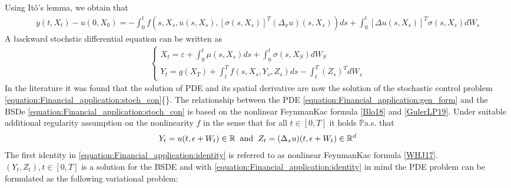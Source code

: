 \documentclass[letterpaper,10pt,english]{jupyterBook}
\begin{document}
\sphinxAtStartPar
Using Itô’s lemma, we obtain that
\begin{equation*}
\begin{split} y(t, X_t) - u(0,X_0) = - \int_0^t f(s,X_s,u(s,X_s), [\sigma(s,X_s)]^T(\Delta_x u)(s,X_s)) ds + \int_0^t[\Delta u(s,X_s)]^T\sigma(s,X_s)dW_s\end{split}
\end{equation*}
\sphinxAtStartPar
A backward stochstic differential equation can be written as
\begin{equation}\label{equation:Financial_application:stoch_con}
\begin{split}\begin{cases} X_t = \varepsilon + \int_0^t \mu(s,X_s) ds + \int_0^t\sigma(s,X_S)dW_S \\ 
Y_t = g(X_T) + \int_t^T f(s, X_s, Y_s, Z_s)ds - \int_t^T(Z_s)^T dW_s
\end{cases} \end{split}
\end{equation}
\sphinxAtStartPar
In the literature it was found that the solution of PDE and its spatial derivative are now the solution of the stochastic control problem \eqref{equation:Financial_application:stoch_con}\{\}. The relationship between the PDE \eqref{equation:Financial_application:gen_form} and the BSDe \eqref{equation:Financial_application:stoch_con} is based on the nonlinear Feynman\sphinxhyphen{}Kac formula {[}\hyperlink{cite.Discussion:id25}{Blo18}{]} and {[}\hyperlink{cite.Discussion:id40}{GulerLP19}{]}. Under suitable additional regularity assumption on the nonlinearity \(f\) in the sense that for all \(t \in[0,T]\) it holds \(\mathbb{P}\)\sphinxhyphen{}a.s. that
\begin{equation}\label{equation:Financial_application:identity}
\begin{split}Y_t = u(t, \epsilon + W_t) \in \mathbb{R}  \hspace{0.2cm}\text{and}\hspace{0.2cm} Z_t = (\Delta_x u) (t, \epsilon + W_t) \in \mathbb{R}^d\end{split}
\end{equation}
\sphinxAtStartPar
The first identity in \eqref{equation:Financial_application:identity} is referred to as nonlinear Feynman\sphinxhyphen{}Kac formula {[}\hyperlink{cite.Discussion:id29}{WHJ17}{]}. \((Y_t, Z_t), t \in [0,T]\) is a solution for the BSDE and with \eqref{equation:Financial_application:identity} in mind the PDE problem can be formulated as the following variational problem:
\end{document}
